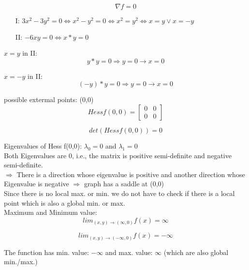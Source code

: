 \documentclass[12pt]{article}
\begin{document}
        $$ \nabla f = 0 $$
         
        \begin{enumerate}
         	\item[I:] $ 3x^2-3y^2=0 \Leftrightarrow x^2-y^2=0 \Leftrightarrow x^2=y^2 \Leftrightarrow x=y \vee x=-y $
         	\item[II:] $ -6xy=0 \Leftrightarrow x*y=0 $
        \end{enumerate}
        
        $x=y$ in II:\\
        $$ y*y = 0 \Rightarrow y = 0 \rightarrow x = 0 $$
        
		$x=-y$ in II:\\
        $$ (-y)*y = 0 \Rightarrow y = 0 \rightarrow x = 0 $$
        
        possible extermal points: (0,0)\\
        
        $$ Hess f(0,0) = \begin{bmatrix} 0 & 0 \\ 0 & 0 \end{bmatrix} $$
        
        $$ det (Hess f(0,0)) = 0 $$
        
        Eigenvalues of Hess f(0,0): $\lambda_0=0$ and $\lambda_1=0$\\
        
        Both Eigenvalues are 0, i.e., the matrix is positive semi-definite and negative semi-definite. \\
        
        $\Rightarrow$ There is a direction whose eigenvalue is positive and another direction whose Eigenvalue is negative $\Rightarrow$ graph has a saddle at (0,0)\\
        
        Since there is no local max. or min. we do not have to check if there is a local point which is also a global min. or max.\\
        
        Maximum and Minimum value:\\
        
        $$ lim_{(x,y)\rightarrow (\infty,0)}f(x)= \infty $$
        
        $$ lim_{(x,y)\rightarrow (-\infty,0)}f(x)= -\infty $$
        
        The function has min. value: $-\infty$ and max. value: $\infty$ (which are also global min./max.)
        
        
        
\end{document}
